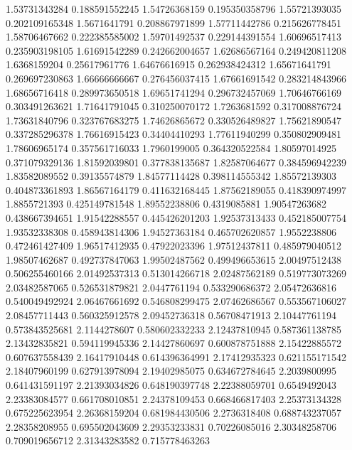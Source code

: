   1.53731343284   0.188591552245
  1.54726368159   0.195350358796
  1.55721393035   0.202109165348
   1.5671641791   0.208867971899
  1.57711442786   0.215626778451
  1.58706467662   0.222385585002
  1.59701492537   0.229144391554
  1.60696517413   0.235903198105
  1.61691542289   0.242662004657
  1.62686567164   0.249420811208
   1.6368159204    0.25617961776
  1.64676616915   0.262938424312
  1.65671641791   0.269697230863
  1.66666666667   0.276456037415
  1.67661691542   0.283214843966
  1.68656716418   0.289973650518
  1.69651741294   0.296732457069
  1.70646766169   0.303491263621
  1.71641791045   0.310250070172
   1.7263681592   0.317008876724
  1.73631840796   0.323767683275
  1.74626865672   0.330526489827
  1.75621890547   0.337285296378
  1.76616915423    0.34404410293
  1.77611940299   0.350802909481
  1.78606965174   0.357561716033
   1.7960199005   0.364320522584
  1.80597014925   0.371079329136
  1.81592039801   0.377838135687
  1.82587064677   0.384596942239
  1.83582089552    0.39135574879
  1.84577114428   0.398114555342
  1.85572139303   0.404873361893
  1.86567164179   0.411632168445
  1.87562189055   0.418390974997
   1.8855721393   0.425149781548
  1.89552238806     0.4319085881
  1.90547263682   0.438667394651
  1.91542288557   0.445426201203
  1.92537313433   0.452185007754
  1.93532338308   0.458943814306
  1.94527363184   0.465702620857
   1.9552238806   0.472461427409
  1.96517412935    0.47922023396
  1.97512437811   0.485979040512
  1.98507462687   0.492737847063
  1.99502487562   0.499496653615
  2.00497512438   0.506255460166
  2.01492537313   0.513014266718
  2.02487562189   0.519773073269
  2.03482587065   0.526531879821
   2.0447761194   0.533290686372
  2.05472636816   0.540049492924
  2.06467661692   0.546808299475
  2.07462686567   0.553567106027
  2.08457711443   0.560325912578
  2.09452736318    0.56708471913
  2.10447761194   0.573843525681
   2.1144278607   0.580602332233
  2.12437810945   0.587361138785
  2.13432835821   0.594119945336
  2.14427860697   0.600878751888
  2.15422885572   0.607637558439
  2.16417910448   0.614396364991
  2.17412935323   0.621155171542
  2.18407960199   0.627913978094
  2.19402985075   0.634672784645
   2.2039800995   0.641431591197
  2.21393034826   0.648190397748
  2.22388059701     0.6549492043
  2.23383084577   0.661708010851
  2.24378109453   0.668466817403
  2.25373134328   0.675225623954
  2.26368159204   0.681984430506
   2.2736318408   0.688743237057
  2.28358208955   0.695502043609
  2.29353233831    0.70226085016
  2.30348258706   0.709019656712
  2.31343283582   0.715778463263
